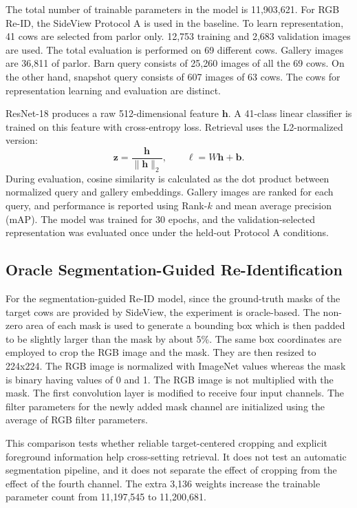 The total number of trainable parameters in the model is 11,903,621. For RGB Re-ID, the SideView Protocol A is used in the baseline. To learn representation, 41 cows are selected from parlor only. 12,753 training and 2,683 validation images are used. The total evaluation is performed on 69 different cows. Gallery images are 36,811 of parlor. Barn query consists of 25,260 images of all the 69 cows. On the other hand, snapshot query consists of 607 images of 63 cows. The cows for representation learning and evaluation are distinct.

ResNet-18 produces a raw 512-dimensional feature $\mathbf{h}$. A 41-class linear classifier is trained on this feature with cross-entropy loss. Retrieval uses the L2-normalized version:
\begin{equation}
 \mathbf{z}=\frac{\mathbf{h}}{\lVert\mathbf{h}\rVert_2},\qquad
 \boldsymbol{\ell}=W\mathbf{h}+\mathbf{b}.
\end{equation}
During evaluation, cosine similarity is calculated as the dot product between normalized query and gallery embeddings. Gallery images are ranked for each query, and performance is reported using Rank-$k$ and mean average precision (mAP). The model was trained for 30 epochs, and the validation-selected representation was evaluated once under the held-out Protocol A conditions.

\subsection{Oracle Segmentation-Guided Re-Identification}

For the segmentation-guided Re-ID model, since the ground-truth masks of the target cows are provided by SideView, the experiment is oracle-based. The non-zero area of each mask is used to generate a bounding box which is then padded to be slightly larger than the mask by about 5\%. The same box coordinates are employed to crop the RGB image and the mask. They are then resized to 224x224. The RGB image is normalized with ImageNet values whereas the mask is binary having values of 0 and 1. The RGB image is not multiplied with the mask. The first convolution layer is modified to receive four input channels. The filter parameters for the newly added mask channel are initialized using the average of RGB filter parameters.

This comparison tests whether reliable target-centered cropping and explicit foreground information help cross-setting retrieval. It does not test an automatic segmentation pipeline, and it does not separate the effect of cropping from the effect of the fourth channel. The extra 3,136 weights increase the trainable parameter count from 11,197,545 to 11,200,681.

